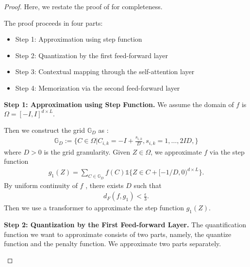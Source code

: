 \documentclass[12pt]{article}
\numberwithin{equation}{section}
\newcommand{\one}{\mathds{1}}
\let\cite\citep
\theoremstyle{theoremstyle}
\numberwithin{equation}{section}
\numberwithin{theorem}{section}
\numberwithin{proposition}{section}
\numberwithin{definition}{section}
\numberwithin{lemma}{section}
\numberwithin{assumption}{section}
\numberwithin{remark}{section}
\begin{document}
\begin{proof}
Here, we restate the proof of  \cite[Theorem H.2]{su2025high} for completeness.

The proof proceeds in four parts:
\begin{itemize}
    \item Step 1: Approximation using step function

    \item Step 2: Quantization by the first feed-forward layer

    \item Step 3: Contextual mapping through the self-attention layer

    \item Step 4: Memorization via the second feed-forward layer
\end{itemize}


\textbf{Step 1: Approximation using Step Function.}
We assume the domain of $f$ is $\Omega=[-I,I]^{d\times L}$.

Then we construct the grid $\mathbb{G}_D$ as :
\begin{align*}
    \mathbb{G}_D:=\{C\in\Omega|C_{i,k}=-I+\frac{s_{i,k}}{D},s_{i,k}=1,\dots,2ID,\}
\end{align*}
where $D>0$ is the grid granularity.
Given $Z\in\Omega$, we approximate $f$ via the step function
\begin{align*}
    g_1(Z)=\sum_{C\in\mathbb{G}_D}f(C)\one\{Z\in C+[-1/D,0)^{d\times L}\}.
\end{align*}
By uniform continuity of $f$ , there exists $D$ such that 
\begin{align*}
    d_F(f,g_1)<\frac{\epsilon}{3}.
\end{align*}
Then we use a transformer to approximate the step function $g_1(Z)$.

\textbf{Step 2: Quantization by the First Feed-forward Layer.}
The quantification function we want to approximate consists of two parts, namely, the quantize function and the penalty function.
We approximate two parts separately.

\begin{itemize}


\end{itemize}
\end{proof}
\end{document}
